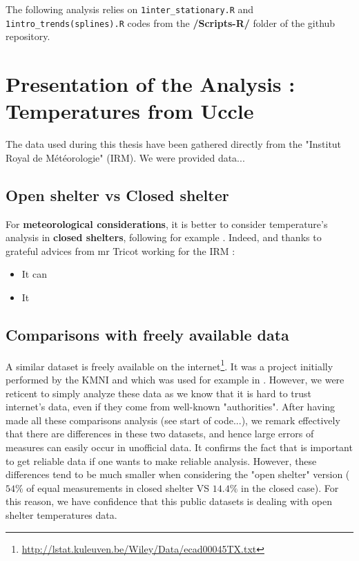 The following analysis relies on \texttt{1inter\_stationary.R} and \texttt{1intro\_trends(splines).R} codes from the \textbf{/Scripts-R/} folder of the github repository.

\section{Presentation of the Analysis : Temperatures from Uccle}

The data used during this thesis have been gathered directly from the "Institut Royal de Météorologie" (IRM). We were provided data...


\subsection{Open shelter vs Closed shelter}

For\textbf{ meteorological considerations}, it is better to consider temperature's analysis in \textbf{closed shelters}, following for example \citet{lindsey_use_1956}. Indeed, and thanks to grateful advices from mr Tricot working for the IRM : 
\begin{itemize}
	\item It can
	\item It
\end{itemize}


\subsection{Comparisons with freely available data} 

A similar dataset is freely available on the internet\footnote{\url{http://lstat.kuleuven.be/Wiley/Data/ecad00045TX.txt}}. It was a project initially performed by the KMNI and which was used for example in \citet{beirlant_statistics_2006}. However, we were reticent to simply analyze these data as we know that it is hard to trust internet's data, even if they come from well-known "authorities". After having made all these comparisons analysis (see start of code...), we remark effectively that there are differences
in these two datasets, and hence large errors of measures can easily occur 
in unofficial data. It confirms the fact that is important to get reliable data if one wants to make reliable analysis. 
However, these differences tend to be much smaller when considering the "open shelter"
version ($54\%$ of equal measurements in closed shelter VS $14.4\%$ in the closed case). For this reason, we have confidence that this public datasets
is dealing with open shelter temperatures data.






